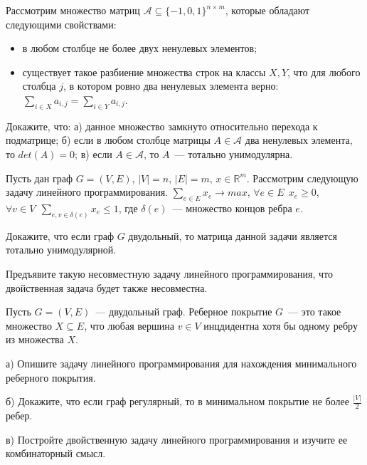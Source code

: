 \setcounter{curtask}{25}


\begin{task}
	Рассмотрим множество матриц $\mathcal{A} \subseteq \{-1, 0, 1\}^{n \times m}$,
	которые обладают следующими свойствами:
    \begin{itemize}
		\item в любом столбце не более двух ненулевых элементов;
    	\item существует такое разбиение множества строк на классы $X, Y$, что
		    для любого столбца $j$, в котором ровно два ненулевых элемента верно:
            $\sum\limits_{i \in X}{a_{i,j}} = \sum\limits_{i \in Y}{a_{i,j}}$.
    \end{itemize}

    Докажите, что:
    а) данное множество замкнуто относительно перехода к подматрице;
    б) если в любом столбце матрицы $A \in \mathcal{A}$ два ненулевых элемента, то
	$det(A) = 0$;
    в) если $A \in \mathcal{A}$, то $A$~--- тотально унимодулярна.
\end{task}


\begin{task}
    Пусть дан граф $G = (V, E)$, $|V| = n$, $|E| = m$, $x \in
    \mathbb{R}^m$. Рассмотрим следующую задачу линейного программирования.
    $\sum_{e \in E} x_e \rightarrow max$, $\forall e \in E ~~ x_e \ge 0$,
    $\forall v \in V ~~ \sum_{e, v \in \delta(e)} x_e \le 1$, где $\delta(e)$~---
    множество концов ребра $e$.

    Докажите, что если граф $G$ двудольный, то матрица данной задачи является
    тотально унимодулярной.
\end{task}

\begin{task}
    Предъявите такую несовместную задачу линейного программирования, что двойственная
    задача будет также несовместна.
\end{task}

\begin{task}
    Пусть $G = (V, E)$~--- двудольный граф. Реберное покрытие $G$~--- это такое
    множество $X \subseteq E$, что любая вершина $v \in V$ инцдидентна хотя бы одному
    ребру из множества $X$.

  	а) Опишите задачу линейного программирования для нахождения минимального
    реберного покрытия.

    б) Докажите, что если граф регулярный, то в минимальном покрытие не более
    $\frac{|V|}{2}$ ребер.

    в) Постройте двойственную задачу линейного программирования и изучите ее
    комбинаторный смысл.
\end{task}



\breakline
